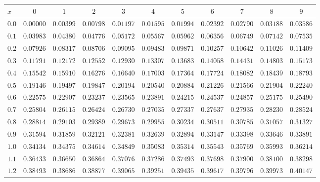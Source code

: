 
\begin{table}[htb!]
\begin{center}
{\scriptsize
\renewcommand\arraystretch{1.250000}
\begin{tabular}{p{22 pt}cccccccccc}
\hline

\rule[-2pt]{0pt}{14pt}$x$ & $0$ & $1$ & $2$ & $3$ & $4$ & $5$ & $6$ & $7$ & $8$ & $9$\\
\hline
\hline
\rule[0pt]{0pt}{15pt}$0.0$ & $0.00000$ & $0.00399$ & $0.00798$ & $0.01197$ & $0.01595$ & $0.01994$ & $0.02392$ & $0.02790$ & $0.03188$ & $0.03586$\\
$0.1$ & $0.03983$ & $0.04380$ & $0.04776$ & $0.05172$ & $0.05567$ & $0.05962$ & $0.06356$ & $0.06749$ & $0.07142$ & $0.07535$\\
$0.2$ & $0.07926$ & $0.08317$ & $0.08706$ & $0.09095$ & $0.09483$ & $0.09871$ & $0.10257$ & $0.10642$ & $0.11026$ & $0.11409$\\
$0.3$ & $0.11791$ & $0.12172$ & $0.12552$ & $0.12930$ & $0.13307$ & $0.13683$ & $0.14058$ & $0.14431$ & $0.14803$ & $0.15173$\\
$0.4$ & $0.15542$ & $0.15910$ & $0.16276$ & $0.16640$ & $0.17003$ & $0.17364$ & $0.17724$ & $0.18082$ & $0.18439$ & $0.18793$\\
$0.5$ & $0.19146$ & $0.19497$ & $0.19847$ & $0.20194$ & $0.20540$ & $0.20884$ & $0.21226$ & $0.21566$ & $0.21904$ & $0.22240$\\
$0.6$ & $0.22575$ & $0.22907$ & $0.23237$ & $0.23565$ & $0.23891$ & $0.24215$ & $0.24537$ & $0.24857$ & $0.25175$ & $0.25490$\\
$0.7$ & $0.25804$ & $0.26115$ & $0.26424$ & $0.26730$ & $0.27035$ & $0.27337$ & $0.27637$ & $0.27935$ & $0.28230$ & $0.28524$\\
$0.8$ & $0.28814$ & $0.29103$ & $0.29389$ & $0.29673$ & $0.29955$ & $0.30234$ & $0.30511$ & $0.30785$ & $0.31057$ & $0.31327$\\
$0.9$ & $0.31594$ & $0.31859$ & $0.32121$ & $0.32381$ & $0.32639$ & $0.32894$ & $0.33147$ & $0.33398$ & $0.33646$ & $0.33891$\\
$1.0$ & $0.34134$ & $0.34375$ & $0.34614$ & $0.34849$ & $0.35083$ & $0.35314$ & $0.35543$ & $0.35769$ & $0.35993$ & $0.36214$\\
$1.1$ & $0.36433$ & $0.36650$ & $0.36864$ & $0.37076$ & $0.37286$ & $0.37493$ & $0.37698$ & $0.37900$ & $0.38100$ & $0.38298$\\
$1.2$ & $0.38493$ & $0.38686$ & $0.38877$ & $0.39065$ & $0.39251$ & $0.39435$ & $0.39617$ & $0.39796$ & $0.39973$ & $0.40147$\\

\end{tabular}}
\end{center}
\end{table}

